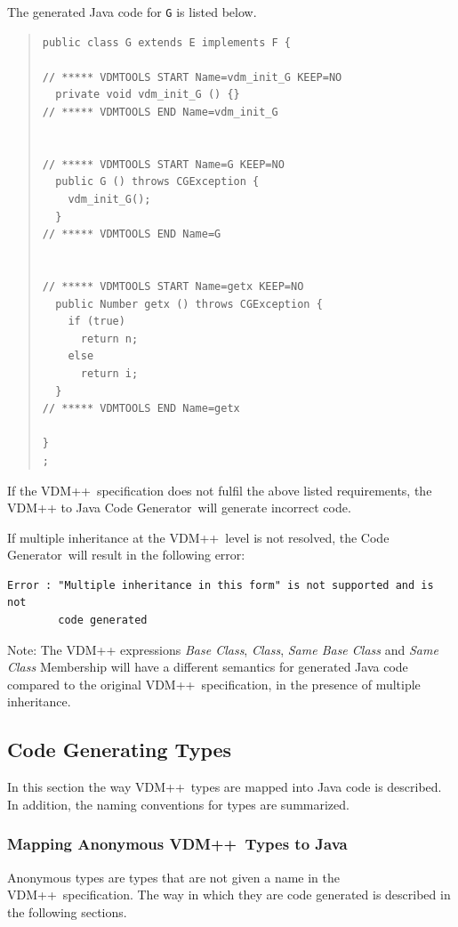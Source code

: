 \documentclass[\pformat,11pt]{article}
\newcommand{\tcg}{the Code Generator}
\newcommand{\VDM}{VDM++}
\newcommand{\cg}{VDM++ to Java Code Generator}
\begin{document}
The generated Java code for \texttt{G} is listed below.

\begin{quote}
\begin{small}
\begin{verbatim}
public class G extends E implements F {

// ***** VDMTOOLS START Name=vdm_init_G KEEP=NO
  private void vdm_init_G () {}
// ***** VDMTOOLS END Name=vdm_init_G


// ***** VDMTOOLS START Name=G KEEP=NO
  public G () throws CGException {
    vdm_init_G();
  }
// ***** VDMTOOLS END Name=G


// ***** VDMTOOLS START Name=getx KEEP=NO
  public Number getx () throws CGException {
    if (true)
      return n;
    else
      return i;
  }
// ***** VDMTOOLS END Name=getx

}
;
\end{verbatim}
\end{small}
\end{quote}

If the \VDM\ specification does not fulfil the above listed
requirements, the \cg\ will generate incorrect code.

If multiple inheritance at the \VDM\ level is not resolved, \tcg\
will result in the following error: 
\begin{verbatim}
Error : "Multiple inheritance in this form" is not supported and is not 
        code generated
\end{verbatim}

Note: The VDM++ expressions {\em Base Class}, {\em Class}, {\em Same
Base Class} and {\em Same Class} Membership will have a different
semantics for generated Java code compared to the original \VDM\
specification, in the presence of multiple inheritance.

\subsection{Code Generating Types}
\label{types}
 In this section the way \VDM\ types are mapped into Java code is described. 
In addition, the naming conventions for types are summarized.


\subsubsection{Mapping Anonymous \VDM\ Types to Java}

Anonymous types are types that are not given a name in the \VDM\
specification. The way in which they are code generated is described
in the following sections.
\end{document}
